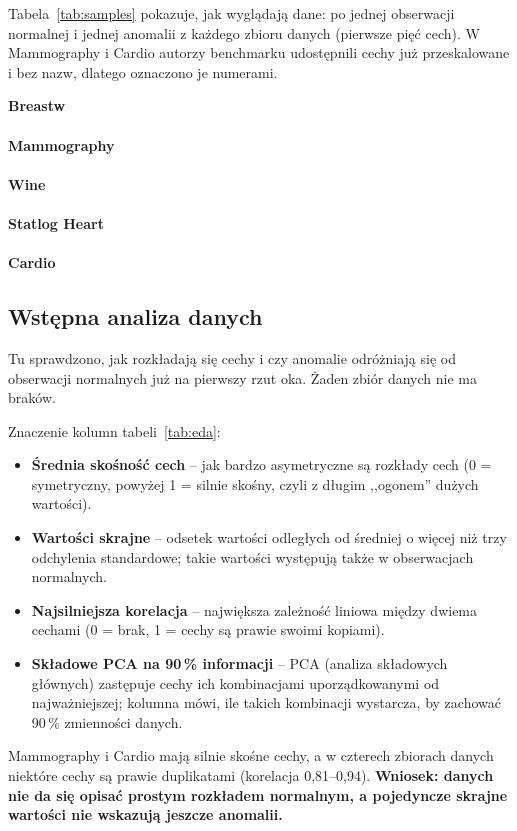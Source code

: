 \documentclass[11pt,a4paper]{article}
\begin{document}
Tabela~\ref{tab:samples} pokazuje, jak wyglądają dane: po jednej obserwacji
normalnej i jednej anomalii z każdego zbioru danych (pierwsze pięć cech).
W Mammography i Cardio autorzy benchmarku udostępnili cechy już
przeskalowane i bez nazw, dlatego oznaczono je numerami.

\begin{table}[H]
  \centering\small
  \setlength{\tabcolsep}{5pt}
  \caption{Przykładowe obserwacje (pierwsze pięć cech; ,,\dots'' -- pozostałe cechy).}
  \label{tab:samples}
  \textbf{Breastw}\\[2pt]\\[6pt]
  \textbf{Mammography}\\[2pt]\\[6pt]
  \textbf{Wine}\\[2pt]\\[6pt]
  \textbf{Statlog Heart}\\[2pt]\\[6pt]
  \textbf{Cardio}\\[2pt]
\end{table}

\FloatBarrier
\subsection{Wstępna analiza danych}

Tu sprawdzono, jak rozkładają się cechy i czy anomalie odróżniają się od
obserwacji normalnych już na pierwszy rzut oka. Żaden zbiór danych nie ma
braków.

\begin{table}[H]
  \centering\small
  \caption{Wskaźniki opisujące kształt danych.}
  \label{tab:eda}
\end{table}

Znaczenie kolumn tabeli~\ref{tab:eda}:
\begin{itemize}
  \item \textbf{Średnia skośność cech} -- jak bardzo asymetryczne są rozkłady
  cech (0 = symetryczny, powyżej 1 = silnie skośny, czyli z długim ,,ogonem''
  dużych wartości).
  \item \textbf{Wartości skrajne} -- odsetek wartości odległych od średniej
  o więcej niż trzy odchylenia standardowe; takie wartości występują także
  w obserwacjach normalnych.
  \item \textbf{Najsilniejsza korelacja} -- największa zależność liniowa
  między dwiema cechami (0 = brak, 1 = cechy są prawie swoimi kopiami).
  \item \textbf{Składowe PCA na 90\,\% informacji} -- PCA (analiza składowych
  głównych) zastępuje cechy ich kombinacjami uporządkowanymi od
  najważniejszej; kolumna mówi, ile takich kombinacji wystarcza, by zachować
  90\,\% zmienności danych.
\end{itemize}
Mammography i Cardio mają silnie skośne cechy, a w czterech zbiorach danych
niektóre cechy są prawie duplikatami (korelacja 0,81--0,94).
\textbf{Wniosek: danych nie da się opisać prostym rozkładem normalnym, a pojedyncze
skrajne wartości nie wskazują jeszcze anomalii.}
\end{document}
